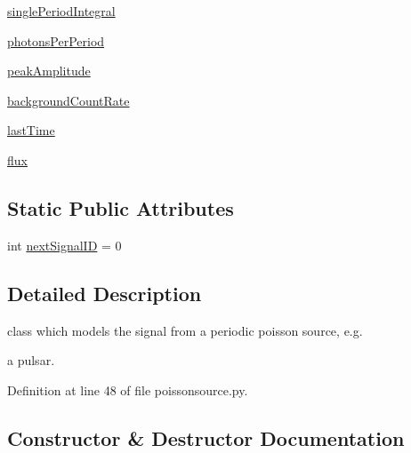 \begin{DoxyCompactItemize}
\hyperlink{classmodest_1_1signals_1_1poissonsource_1_1PeriodicPoissonSource_a7ac3284a45a9d165fe8d6b6fe8fd4b0e}{single\+Period\+Integral}
\item 
\hyperlink{classmodest_1_1signals_1_1poissonsource_1_1PeriodicPoissonSource_aab9b9fda33f78fe5f0e47c62f2b34e51}{photons\+Per\+Period}
\item 
\hyperlink{classmodest_1_1signals_1_1poissonsource_1_1PeriodicPoissonSource_a2616e8654edeac61b5616c6bc7333138}{peak\+Amplitude}
\item 
\hyperlink{classmodest_1_1signals_1_1poissonsource_1_1PeriodicPoissonSource_a2b2a18ec8c79861151d9d19ba9c8f982}{background\+Count\+Rate}
\item 
\hyperlink{classmodest_1_1signals_1_1poissonsource_1_1PoissonSource_a34395fc83bd8743a0a5ee69f9392a606}{last\+Time}
\item 
\hyperlink{classmodest_1_1signals_1_1poissonsource_1_1PoissonSource_a6f2c657ad936b921715d826ac74f7fe5}{flux}
\end{DoxyCompactItemize}
\subsection*{Static Public Attributes}
\begin{DoxyCompactItemize}
\item 
int \hyperlink{classmodest_1_1signals_1_1signalsource_1_1SignalSource_a453eafb550b551adbec0903deb63dfce}{next\+Signal\+ID} = 0
\end{DoxyCompactItemize}


\subsection{Detailed Description}
class which models the signal from a periodic poisson source, e.\+g. 

a pulsar. 

Definition at line 48 of file poissonsource.\+py.



\subsection{Constructor \& Destructor Documentation}
